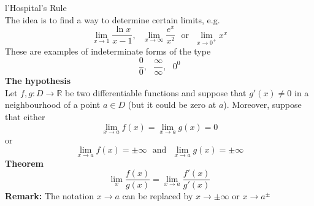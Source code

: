 \documentclass[]{article}
\begin{document}
	\Large{l'Hospital's Rule}\\
	\normalsize
	The idea is to find a way to determine certain limits, e.g.
	$$
		\lim_{x\to 1}\frac{\ln x}{x-1},~~~\lim_{x\to\infty}\frac{e^x}{x^2}~~~\text{or}~~~\lim_{x\to 0^+}x^x
	$$
	These are examples of indeterminate forms of the type
	$$
		\frac{0}0,~~~\frac{\infty}\infty,~~~0^0
	$$
	{\bf The hypothesis}\\
	Let $f,g:D\rightarrow\mathbb{R}$ be two differentiable functions and suppose that $g'(x)\ne 0$ in a neighbourhood of a point $a\in D$ (but it could be zero at $a$). Moreover, suppose that either
	$$
		\lim_{x\to a}f(x)=\lim_{x\to a}g(x)=0
	$$
	or
	$$
		\lim_{x\to a}f(x)=\pm\infty~~~\text{and}~~~\lim_{x\to a}g(x)=\pm\infty
	$$
	{\bf Theorem}
	$$
		\lim_{x}\frac{f(x)}{g(x)}=\lim_{x\to a}\frac{f'(x)}{g'(x)}
	$$
	{\bf Remark:} The notation $x\to a$ can be replaced by $x\to\pm\infty$ or $x\to a^{\pm}$
\end{document}
